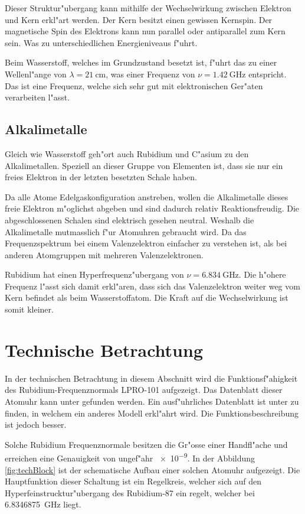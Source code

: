 \begin{refsection}
Dieser Struktur"ubergang kann mithilfe der Wechselwirkung zwischen
Elektron und Kern erkl"art werden. Der Kern besitzt einen gewissen
Kernspin. Der magnetische Spin des Elektrons kann nun parallel oder
antiparallel zum Kern sein. Was zu unterschiedlichen Energieniveaus
f"uhrt.

Beim Wasserstoff, welches im Grundzustand besetzt ist, f"uhrt das zu
einer Wellenl"ange von $\lambda = \SI{21}{\centi\meter}$, was einer
Frequenz von $\nu = \SI{1.42}{\giga\hertz}$ entspricht. Das ist eine
Frequenz, welche sich sehr gut mit elektronischen Ger"aten verarbeiten
l"asst.

\subsection{Alkalimetalle}
Gleich wie Wasserstoff geh"ort auch Rubidium und C"asium zu den
Alkalimetallen. Speziell an dieser Gruppe von Elementen ist, dass sie
nur ein freies Elektron in der letzten besetzten Schale haben.

Da alle Atome Edelgaskonfiguration anstreben, wollen die Alkalimetalle
dieses freie Elektron m"oglichst abgeben und sind dadurch relativ
Reaktionsfreudig.  Die abgeschlossenen Schalen sind elektrisch gesehen
neutral.  Weshalb die Alkalimetalle mutmasslich f"ur Atomuhren
gebraucht wird.  Da das Frequenzspektrum bei einem Valenzelektron
einfacher zu verstehen ist, als bei anderen Atomgruppen mit mehreren
Valenzelektronen.

Rubidium hat einen Hyperfrequenz"ubergang von $\nu =
\SI{6.834}{\giga\hertz}$. Die h"ohere Frequenz l"asst sich damit
erkl"aren, dass sich das Valenzelektron weiter weg vom Kern befindet
als beim Wasserstoffatom. Die Kraft auf die Wechselwirkung ist somit
kleiner.

\section{Technische Betrachtung}
In der technischen Betrachtung in diesem Abschnitt wird die
Funktionsf"ahigkeit des Rubidium-Frequenznormals LPRO-101 aufgezeigt.
Das Datenblatt dieser Atomuhr kann unter \cite{datasheet:lpro}
gefunden werden.  Ein ausf"uhrliches Datenblatt ist unter
\cite{datasheet:prs10m} zu finden, in welchem ein anderes Modell
erkl"ahrt wird.  Die Funktionsbeschreibung ist jedoch besser.

Solche Rubidium Frequenznormale besitzen die Gr"osse einer Handfl"ache
und erreichen eine Genauigkeit von ungef"ahr \num{e-9}.  In der
Abbildung \ref{fig:techBlock} ist der schematische Aufbau einer
solchen Atomuhr aufgezeigt.  Die Hauptfunktion dieser Schaltung ist
ein Regelkreis, welcher sich auf den Hyperfeinstrucktur"ubergang des
Rubidium-87 ein regelt, welcher bei \SI{6.8346875}{\giga\hertz} liegt.


\end{refsection}
